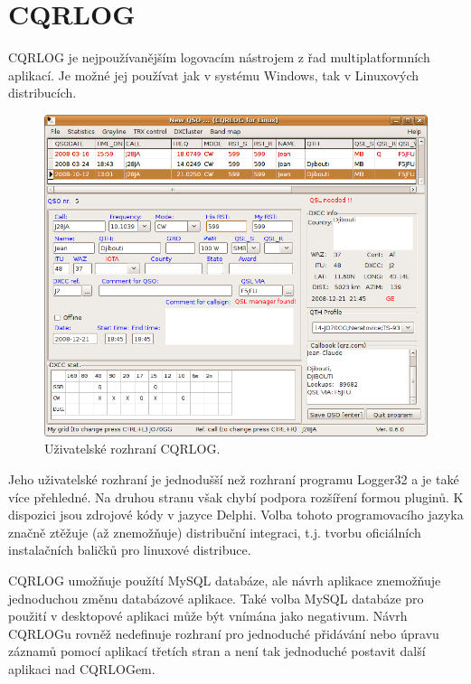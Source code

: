 \section{CQRLOG}

CQRLOG je nejpoužívanějším logovacím nástrojem z řad multiplatformních aplikací. Je možné jej používat jak v systému
Windows, tak v Linuxových distribucích.

\begin{figure}[h]
\centering
\includegraphics[trim=0cm 0cm 0cm 0cm, scale=0.5]{fig/cqrlog}
\caption{Uživatelské rozhraní CQRLOG.}
\label{fig:FigureExample}
\end{figure}

Jeho uživatelské rozhraní je jednodušší než rozhraní programu Logger32 a je také více přehledné. Na druhou stranu však
chybí podpora rozšíření formou pluginů. K dispozici jsou zdrojové kódy v jazyce
Delphi. %
Volba tohoto programovacího jazyka
značně ztěžuje (až znemožňuje) distribuční integraci, t.j. tvorbu oficiálních instalačních baličků pro linuxové distribuce.

CQRLOG umožňuje použítí
MySQL databáze, ale návrh aplikace znemožňuje jednoduchou změnu databázové aplikace. Také volba MySQL databáze pro použití 
v desktopové aplikaci může být vnímána jako negativum. Návrh CQRLOGu rovněž nedefinuje rozhraní pro jednoduché přidávání nebo úpravu
záznamů pomocí aplikací třetích stran a není tak jednoduché postavit další aplikaci nad CQRLOGem.

